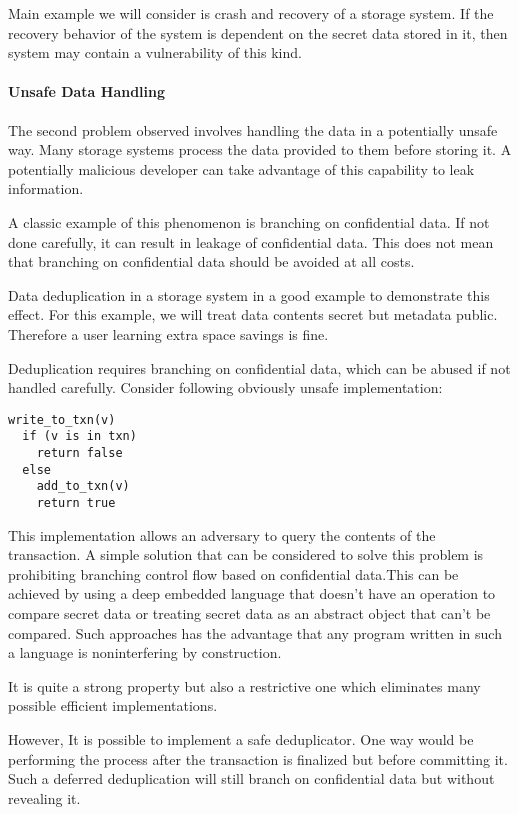 Main example we will consider is crash and recovery of a storage system. If the recovery behavior of the system is dependent on the secret data stored in it, then system may contain a vulnerability of this kind. 

\paragraph{Unsafe Data Handling}
The second problem observed involves handling the data in a potentially unsafe way. Many storage systems process the data provided to them before storing it. A potentially malicious developer can take advantage of this capability to leak information.

A classic example of this phenomenon is branching on confidential data. If not done carefully, it can result in leakage of confidential data. This does not mean that branching on confidential data should be avoided at all costs.

Data deduplication in a storage system in a good example to demonstrate this effect. For this example, we will treat data contents secret but metadata public. Therefore a user learning extra space savings is fine.

Deduplication requires branching on confidential data, which can be abused if not handled carefully. Consider following obviously unsafe implementation:

\begin{lstlisting}
write_to_txn(v)
  if (v is in txn)
    return false
  else
    add_to_txn(v)
    return true
\end{lstlisting}

This implementation allows an adversary to query the contents of the transaction. 
A simple solution that can be considered to solve this problem is prohibiting branching control flow based on confidential data.This can be achieved by using a deep embedded language that doesn't have an operation to compare secret data or treating secret data as an abstract object that can't be compared. Such approaches has the advantage 
that any program written in such a language is noninterfering by construction. 

It is quite a strong property but also a restrictive one which eliminates many possible efficient implementations.

However, It is possible to implement a safe deduplicator. One way would be performing the process after the transaction is finalized but before committing it. Such a deferred deduplication will still branch on confidential data but without revealing it.

